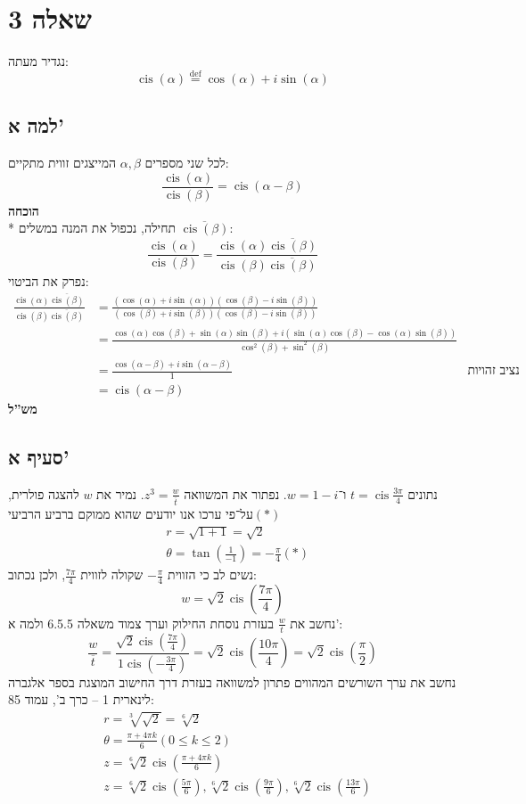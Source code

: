 \documentclass[a4paper,10pt]{article}
\DeclareMathOperator\cis{cis}
\begin{document}
	\section{שאלה 3}
	נגדיר מעתה:
	\[
		\cis(\alpha) \overset{\text{def}}{=} \cos(\alpha) + i \sin(\alpha)
	\]
	\subsection{למה א'}
	לכל שני מספרים $\alpha, \beta$ המייצגים זווית מתקיים:
	\[
		\frac{ \cis(\alpha)}{\cis(\beta) } =
		\cis(\alpha - \beta)
	\]
	\textbf{הוכחה} \\*
	תחילה, נכפול את המנה במשלים $\overline{\cis(\beta)}$:
	\[
		\frac{ \cis(\alpha)}{\cis(\beta) } =
		\frac{ \cis(\alpha) \overline{\cis(\beta)}}{\cis(\beta) \overline{\cis(\beta)} }
	\]
	נפרק את הביטוי:
	\begin{align*}
		\frac{ \cis(\alpha) \overline{\cis(\beta)}}{\cis(\beta) \overline{\cis(\beta)} }
		& =
		\frac
		{(\cos(\alpha) + i \sin(\alpha))(\cos(\beta) - i \sin(\beta))}
		{(\cos(\beta) + i \sin(\beta))(\cos(\beta) - i \sin(\beta))} \\
		& =
		\frac
		{\cos(\alpha)\cos(\beta) + \sin(\alpha)\sin(\beta)
		+ i(\sin(\alpha) \cos(\beta) - \cos(\alpha) \sin(\beta))}
		{\cos^2(\beta) + \sin^2(\beta)} \\
		& =
		\frac{ \cos(\alpha - \beta) + i \sin(\alpha - \beta)}{1}
		& \text{נציב זהויות טריגונומטריות:} \\
		& = \cis(\alpha - \beta)
	\end{align*}
	\textbf{מש''ל}

	\subsection{סעיף א'}
	נתונים $t = \cis \frac{ 3\pi}{4}$ ו־$w = 1 - i$.
	נפתור את המשוואה $z^3 = \frac{w}{\overline{t}}$.
	נמיר את $w$ להצגה פולרית,
	על־פי ערכו אנו יודעים שהוא ממוקם ברביע הרביעי$(*)$
	\begin{align*}
		& r = \sqrt{1 + 1} = \sqrt{2} \\
		& \theta = \tan(\frac{1}{-1}) = -\frac{\pi}{4} (*)
	\end{align*}
	נשים לב כי הזווית $-\frac{\pi}{4}$ שקולה לזווית $\frac{7\pi}{4}$,
	ולכן נכתוב:
	\[
		w = \sqrt{2} \cis(\frac{7\pi}{4})
	\]
	נחשב את $\frac{w}{t}$ בעזרת נוסחת החילוק וערך צמוד משאלה 6.5.5 ולמה א':
	\[
		\frac{w}{\overline{t}} =
		\frac{\sqrt{2} \cis(\frac{7 \pi}{4})}{1 \cis(-\frac{3 \pi}{4})} =
		\sqrt{2} \cis(\frac{10 \pi}{4}) =
		\sqrt{2} \cis(\frac{\pi}{2})
	\]
	נחשב את ערך השורשים המהווים פתרון למשוואה בעזרת דרך החישוב המוצגת בספר אלגברה לינארית 1 – כרך ב', עמוד 85:
	\begin{align*}
		& r = \sqrt[3]{\sqrt{2}} = \sqrt[6]{2} \\
		& \theta = \frac{\pi + 4\pi k}{6} (0 \le k \le 2) \\
		& z = \sqrt[6]{2} \cis(\frac{\pi + 4\pi k}{6}) \\
		& z =   \sqrt[6]{2} \cis(\frac{5\pi}{6}),
				\sqrt[6]{2} \cis(\frac{9\pi}{6}),
				\sqrt[6]{2} \cis(\frac{13\pi}{6})
	\end{align*}
\end{document}
